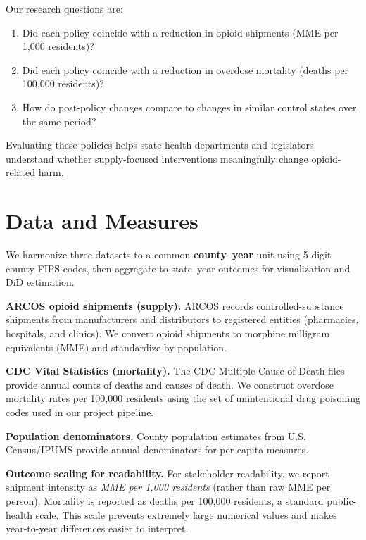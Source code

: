 \documentclass[11pt]{article}
\begin{document}
Our research questions are:
\begin{enumerate}[leftmargin=*]
    \item Did each policy coincide with a reduction in opioid shipments (MME per 1{,}000 residents)?
    \item Did each policy coincide with a reduction in overdose mortality (deaths per 100{,}000 residents)?
    \item How do post-policy changes compare to changes in similar control states over the same period?
\end{enumerate}
Evaluating these policies helps state health departments and legislators understand whether supply-focused interventions meaningfully change opioid-related harm.

\section{Data and Measures}

We harmonize three datasets to a common \textbf{county--year} unit using 5-digit county FIPS codes, then aggregate to state--year outcomes for visualization and DiD estimation.

\textbf{ARCOS opioid shipments (supply).} ARCOS records controlled-substance shipments from manufacturers and distributors to registered entities (pharmacies, hospitals, and clinics). We convert opioid shipments to morphine milligram equivalents (MME) and standardize by population.

\textbf{CDC Vital Statistics (mortality).} The CDC Multiple Cause of Death files provide annual counts of deaths and causes of death. We construct overdose mortality rates per 100{,}000 residents using the set of unintentional drug poisoning codes used in our project pipeline.

\textbf{Population denominators.} County population estimates from U.S. Census/IPUMS provide annual denominators for per-capita measures.

\textbf{Outcome scaling for readability.} For stakeholder readability, we report shipment intensity as \emph{MME per 1{,}000 residents} (rather than raw MME per person). Mortality is reported as deaths per 100{,}000 residents, a standard public-health scale. This scale prevents extremely large numerical values and makes year-to-year differences easier to interpret.

\end{document}
